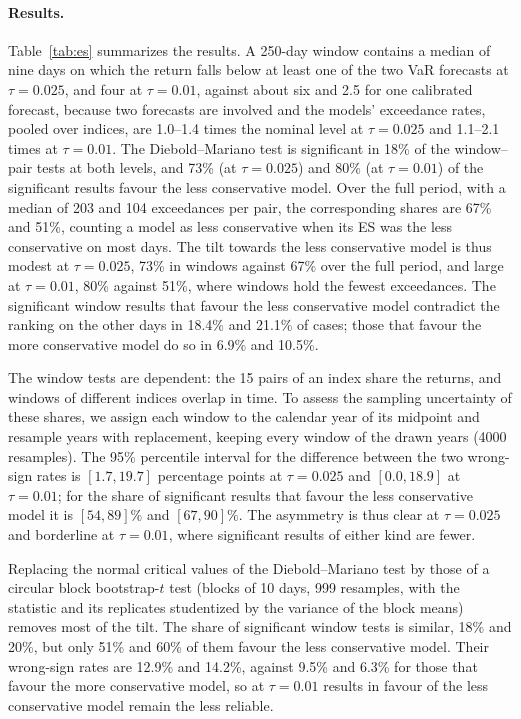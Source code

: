 \paragraph{Results.}
Table~\ref{tab:es} summarizes the results. A 250-day window contains a
median of nine days on which the return falls below at least one of the two
VaR forecasts at $\tau=0.025$, and four at $\tau=0.01$, against about six
and 2.5 for one calibrated forecast, because two forecasts are involved and
the models' exceedance rates, pooled over indices, are 1.0--1.4 times the
nominal level at $\tau=0.025$ and 1.1--2.1 times at $\tau=0.01$. The Diebold--Mariano test
is significant in 18\% of the window--pair tests at both levels, and 73\%
(at $\tau=0.025$) and 80\% (at $\tau=0.01$) of the significant results
favour the less conservative model. Over the full period, with a median of
203 and 104 exceedances per pair, the corresponding shares are 67\% and
51\%, counting a model as less conservative when its ES was the less
conservative on most days. The tilt towards the less conservative model is
thus modest at $\tau=0.025$, 73\% in windows against 67\% over the full
period, and large at $\tau=0.01$, 80\% against 51\%, where windows hold
the fewest exceedances. The significant window results that favour the less
conservative model contradict the ranking on the other days in 18.4\% and
21.1\% of cases; those that favour the more conservative model do so in
6.9\% and 10.5\%.

The window tests are dependent: the 15 pairs of an index share the returns,
and windows of different indices overlap in time. To assess the sampling
uncertainty of these shares, we assign each window to the calendar year of
its midpoint and resample years with replacement, keeping every window of
the drawn years (4000 resamples). The 95\% percentile interval for the
difference between the two wrong-sign rates is $[1.7,19.7]$ percentage
points at $\tau=0.025$ and $[0.0,18.9]$ at $\tau=0.01$; for the share of
significant results that favour the less conservative model it is
$[54,89]\%$ and $[67,90]\%$. The asymmetry is thus clear at
$\tau=0.025$ and borderline at $\tau=0.01$, where significant results of
either kind are fewer.

Replacing the normal critical values of the Diebold--Mariano test by those
of a circular block bootstrap-$t$ test (blocks of 10 days, 999 resamples,
with the statistic and its replicates studentized by the variance of the
block means) removes most of the tilt. The share of significant window
tests is similar, 18\% and 20\%, but only 51\% and 60\% of them favour the
less conservative model. Their wrong-sign rates are 12.9\% and 14.2\%,
against 9.5\% and 6.3\% for those that favour the more conservative
model, so at $\tau=0.01$ results
in favour of the less conservative model remain the less reliable.

